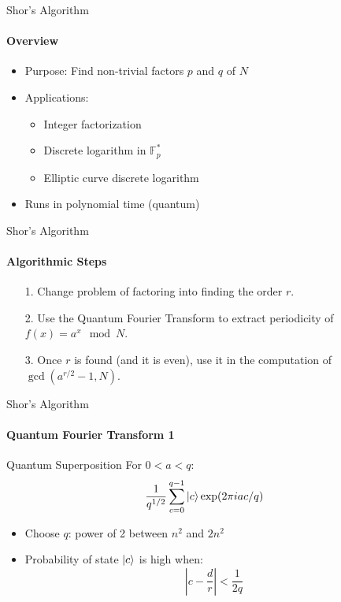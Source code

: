 \documentclass{beamer}
\begin{document}
\begin{frame}{Shor's Algorithm}
	\framesubtitle{Overview}
    \begin{itemize}
        \item Purpose: Find non-trivial factors \(p\) and \(q\) of \(N\)
        \item Applications:
            \begin{itemize}
                \item Integer factorization
                \item Discrete logarithm in \(\mathbb{F}_p^*\)
                \item Elliptic curve discrete logarithm
            \end{itemize}
        \item Runs in polynomial time (quantum)
    \end{itemize}
\end{frame}




\begin{frame}{Shor's Algorithm}
	\framesubtitle{Algorithmic Steps}
	\begin{itemize}
		\item[1.] Change problem of factoring into finding the order \(r\).
		\pause
		\item[2.] Use the Quantum Fourier Transform to extract periodicity of \(f(x) = a^x \mod N\).
		\pause
		\item[3.] Once \(r\) is found (and it is even), use it in the computation of \(\gcd(a^{r/2} - 1, N)\).   
	\end{itemize}
	
\end{frame}




\begin{frame}{Shor's Algorithm}
	\framesubtitle{Quantum Fourier Transform 1}
    \begin{block}{Quantum Superposition}
        For \(0 < a < q\):
        \[ \frac{1}{q^{1/2}} \sum_{c = 0}^{q - 1} \ket{c} \exp(2\pi i a c /q) \]
    \end{block}
    \begin{itemize}
        \item Choose \(q\): power of 2 between \(n^2\) and \(2n^2\)
        \item Probability of state \(\ket{c}\) is high when:
        \[ \left| c - \frac{d}{r} \right| < \frac{1}{2q} \]
    \end{itemize}
\end{frame}
\end{document}
